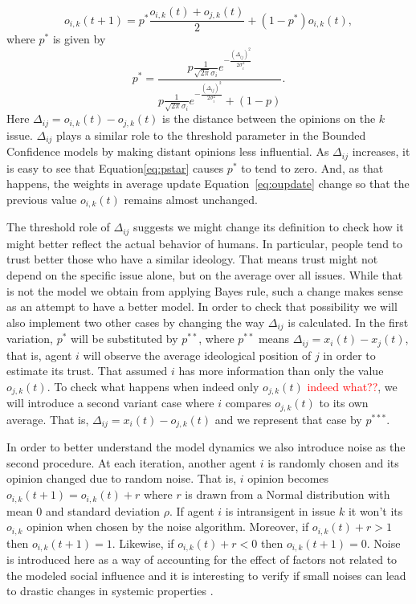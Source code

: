\documentclass{article}
\begin{document}
  \begin{equation}\label{eq:oupdate}
    o_{i,k}(t+1) =
    p^{*}
    \frac{o_{i,k}(t) + o_{j,k}(t) }{2}
    +
    (1 - p^{*})
    o_{i,k}(t),
  \end{equation}
where  $p^{*}$ is given by
  \begin{equation}\label{eq:pstar}
   p^{*}
    =
  \frac{
      p \frac{1}{\sqrt{2 \pi} \sigma_i}
      e^{- \frac{ (\Delta_{ij})^2}{2 \sigma_i^2}}
    }{
      p
      \frac{1}{\sqrt{2 \pi} \sigma_i}
    e^{- \frac{ ( \Delta_{ij})^2}{2 \sigma_i^2}}
    +
    (1 - p)
  }.
  \end{equation}
Here \(\Delta_{ij} = o_{i,k} (t) - o_{j,k} (t)\) is the distance between the opinions on the $k$ issue. $\Delta_{ij}$ plays a
similar role to the threshold parameter in the Bounded Confidence models by making distant opinions less influential. As $\Delta_{ij}$ increases, it is easy to see that Equation\ref{eq:pstar} causes  $p^{*}$ to tend to zero. And, as that happens, the weights in average update Equation~\ref{eq:oupdate} change so that the previous value $ o_{i,k}(t)$ remains almost unchanged.

The threshold role of $\Delta_{ij}$ suggests we might change its definition to check how it might better reflect the actual behavior of humans. In particular, people tend to trust better those who have a similar ideology. That means trust might not depend on the specific issue alone, but on the average over all issues. While that is not the model we obtain from applying Bayes rule, such a change makes sense
as an attempt to have a better model. In order to check that possibility we will also implement two other cases by changing the way $\Delta_{ij}$ is calculated. In the first variation, $p^*$ will be substituted by \(p^{**}\), where \(p^{**}\) means 
 \(\Delta_{ij} = x_i(t) - x_j(t) \), that is, agent $i$ will observe the average
 ideological position of $j$ in order to estimate its trust. That assumed $i$
 has more information than only the value $o_{j,k}(t)$. To check what happens
 when indeed only $o_{j,k}(t)$ \textcolor{red}{indeed what??}, we will introduce a second variant case where $i$ compares $o_{j,k}(t)$ to its own average. That is,  \(\Delta_{ij} = x_{i}(t) - o_{j,k}(t)\) and we represent that case by \(p^{***}\).

In order to better understand the model dynamics we also introduce noise as the second procedure. At each iteration, 
another agent \(i\) is randomly chosen and its opinion changed due to random noise. That is, $i$ opinion becomes \(
o_{i,k}(t+1) = o_{i,k}(t) + r \) where \(r\) is drawn from a Normal
distribution with mean 0 and standard deviation \(\rho\). If agent \(i\) is intransigent in
issue \(k\) it won't its \(o_{i,k}\) opinion when chosen by
the noise algorithm. Moreover, if \(o_{i,k}(t) + r > 1\) then \( o_{i,k}(t+1) =
1\). Likewise, if \(o_{i,k}(t) + r < 0 \) then \( o_{i,k}(t+1) = 0\). Noise
is introduced here as a way of accounting for the effect of factors not related to the modeled
social influence \cite{flache2017} and it is interesting to verify if small noises can lead to drastic changes in
systemic properties \cite{macy2015signal}.
\end{document}
